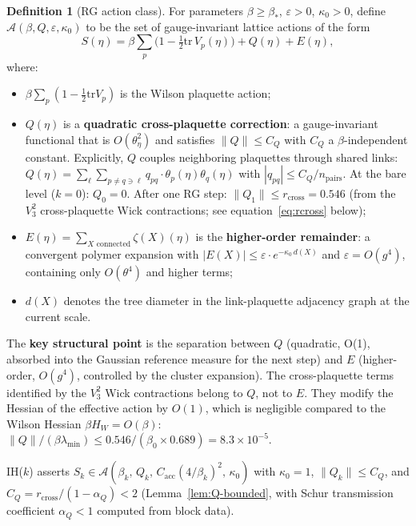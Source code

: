 \documentclass[11pt]{article}
\theoremstyle{definition}
\newtheorem{definition}[theorem]{Definition}
\newcommand{\tr}{\mathrm{tr}}
\begin{document}
\begin{definition}[RG action class]\label{def:action-class}
For parameters $\beta\ge\beta_*$, $\varepsilon>0$, $\kappa_0>0$,
define $\mathcal{A}(\beta,Q,\varepsilon,\kappa_0)$ to be the set of
gauge-invariant lattice actions of the form
\begin{equation}\label{eq:action-class}
S(\eta)=\beta\sum_p\bigl(1-\tfrac{1}{2}\tr\,V_p(\eta)\bigr)
+Q(\eta)+E(\eta),
\end{equation}
where:
\begin{itemize}[nosep]
\item $\beta\sum_p(1-\frac{1}{2}\tr V_p)$ is the Wilson plaquette action;
\item $Q(\eta)$ is a \textbf{quadratic cross-plaquette correction}:
a gauge-invariant functional that is $O(\theta_\eta^2)$ and satisfies
$\|Q\|\le C_Q$ with $C_Q$ a $\beta$-independent constant.
Explicitly, $Q$ couples neighboring plaquettes through
shared links: $Q(\eta)=\sum_{\ell}\sum_{p\ne q\ni\ell}
q_{pq}\cdot\theta_p(\eta)\theta_q(\eta)$ with
$|q_{pq}|\le C_Q/n_{\mathrm{pairs}}$.
At the bare level ($k=0$): $Q_0=0$.
After one RG step: $\|Q_1\|\le r_{\mathrm{cross}}=0.546$
(from the $V_3^2$ cross-plaquette Wick contractions;
see equation~\eqref{eq:rcross} below);
\item $E(\eta)=\sum_{X\text{ connected}}\zeta(X)(\eta)$ is the
\textbf{higher-order remainder}: a convergent
polymer expansion with $|E(X)|\le\varepsilon\cdot e^{-\kappa_0\,d(X)}$
and $\varepsilon=O(g^4)$, containing only $O(\theta^4)$ and higher terms;
\item $d(X)$ denotes the tree diameter in the link-plaquette
adjacency graph at the current scale.
\end{itemize}

The \textbf{key structural point} is the separation between $Q$
(quadratic, O(1), absorbed into the Gaussian reference measure for
the next step) and $E$ (higher-order, $O(g^4)$, controlled by the
cluster expansion).  The cross-plaquette terms identified by the
$V_3^2$ Wick contractions belong to $Q$, not to $E$.
They modify the Hessian of the effective action by $O(1)$,
which is negligible compared to the Wilson Hessian $\beta H_W=O(\beta)$:
$\|Q\|/(\beta\lambda_{\min})\le 0.546/(\beta_0\times 0.689)
=8.3\times 10^{-5}$.

IH($k$) asserts $S_k\in\mathcal{A}(\beta_k,\,Q_k,\,
C_{\mathrm{acc}}(4/\beta_k)^2,\,\kappa_0)$ with $\kappa_0=1$,
$\|Q_k\|\le C_Q$, and $C_Q=r_{\mathrm{cross}}/(1-\alpha_Q)<2$
(Lemma~\ref{lem:Q-bounded}, with Schur transmission
coefficient $\alpha_Q<1$ computed from block data).


\end{definition}
\end{document}
